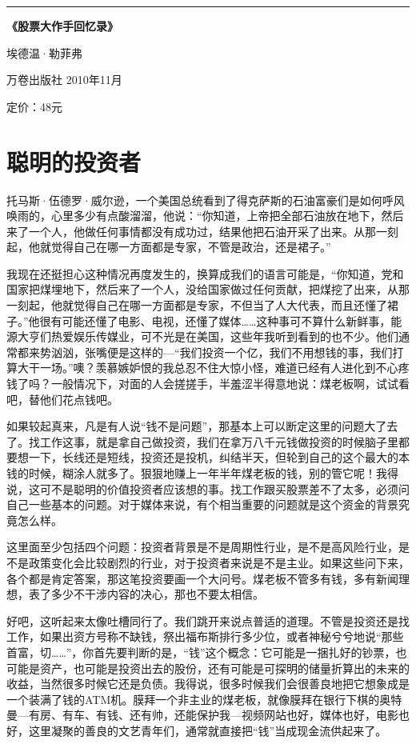 \begin{center}\rule{0.5\linewidth}{0.5pt}\end{center}

\textbf{《股票大作手回忆录》}

埃德温·勒菲弗

万卷出版社 2010年11月

定价：48元

\hypertarget{ux806aux660eux7684ux6295ux8d44ux8005}{%
\section{聪明的投资者}\label{ux806aux660eux7684ux6295ux8d44ux8005}}

托马斯·伍德罗·威尔逊，一个美国总统看到了得克萨斯的石油富豪们是如何呼风唤雨的，心里多少有点酸溜溜，他说：``你知道，上帝把全部石油放在地下，然后来了一个人，他做任何事情都没有成功过，结果他把石油开采了出来。从那一刻起，他就觉得自己在哪一方面都是专家，不管是政治，还是裙子。''

我现在还挺担心这种情况再度发生的，换算成我们的语言可能是，``你知道，党和国家把煤埋地下，然后来了一个人，没给国家做过任何贡献，把煤挖了出来，从那一刻起，他就觉得自己在哪一方面都是专家，不但当了人大代表，而且还懂了裙子。''他很有可能还懂了电影、电视，还懂了媒体\ldots\ldots 这种事可不算什么新鲜事，能源大亨们热爱娱乐传媒业，可不光是在美国，这些年我听到看到的也不少。他们通常都来势汹汹，张嘴便是这样的---``我们投资一个亿，我们不用想钱的事，我们打算大干一场。''噢？羡慕嫉妒恨的我总忍不住大惊小怪，难道已经有人进化到不心疼钱了吗？一般情况下，对面的人会搓搓手，半羞涩半得意地说：煤老板啊，试试看吧，替他们花点钱吧。

如果较起真来，凡是有人说``钱不是问题''，那基本上可以断定这里的问题大了去了。找工作这事，就是拿自己做投资，我们在拿万八千元钱做投资的时候脑子里都要想一下，长线还是短线，投资还是投机，纠结半天，但轮到自己的这个最大的本钱的时候，糊涂人就多了。狠狠地赚上一年半年煤老板的钱，别的管它呢！我得说，这可不是聪明的价值投资者应该想的事。找工作跟买股票差不了太多，必须问自己一些基本的问题。对于媒体来说，有个相当重要的问题就是这个资金的背景究竟怎么样。

这里面至少包括四个问题：投资者背景是不是周期性行业，是不是高风险行业，是不是政策变化会比较剧烈的行业，对于投资者来说是不是主业。如果这些问下来，各个都是肯定答案，那这笔投资要画一个大问号。煤老板不管多有钱，多有新闻理想，表了多少不干涉内容的决心，那也不要太相信。

好吧，这听起来太像吐槽同行了。我们跳开来说点普适的道理。不管是投资还是找工作，如果出资方号称不缺钱，祭出福布斯排行多少位，或者神秘兮兮地说``那些首富，切\ldots\ldots''，你首先要判断的是，``钱''这个概念：它可能是一捆扎好的钞票，也可能是资产，也可能是投资出去的股份，还有可能是可探明的储量折算出的未来的收益，当然很多时候它还是负债。我得说，很多时候我们会很善良地把它想象成是一个装满了钱的ATM机。膜拜一个非主业的煤老板，就像膜拜在银行下棋的奥特曼---有房、有车、有钱、还有帅，还能保护我---视频网站也好，媒体也好，电影也好，这里凝聚的善良的文艺青年们，通常就直接把``钱''当成现金流供起来了。

